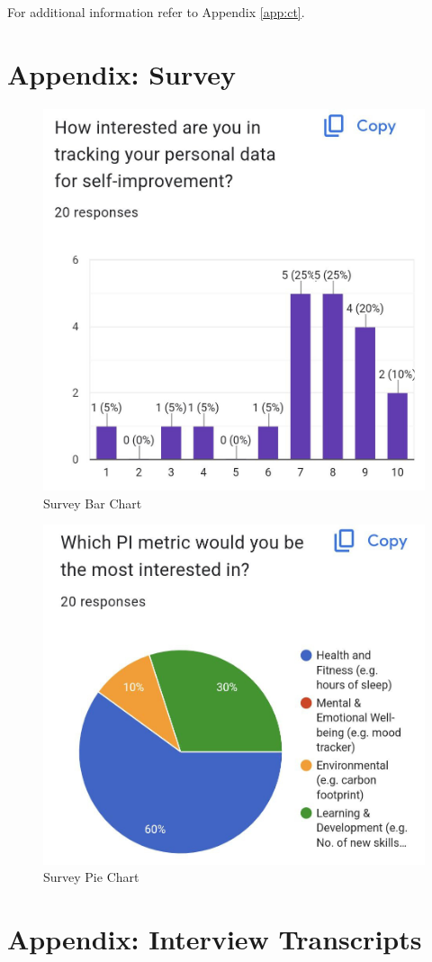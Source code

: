 \documentclass[11pt]{article}
\begin{document}
For additional information refer to Appendix \ref{app:ct}.

\newpage


\section{Appendix: Survey}\label{app:survey}
\begin{figure}[!ht]
\centering
    \includegraphics[width=0.6\linewidth]{survey1.jpg}
\caption{Survey Bar Chart}
\label{fig:survey1}
\end{figure}
\begin{figure}[!ht]
\centering
    \includegraphics[width=0.6\linewidth]{survey2.jpg}
\caption{Survey Pie Chart}
\label{fig:survey2}
\end{figure}

\newpage


\section{Appendix: Interview Transcripts}\label{app:interviews}
\end{document}

